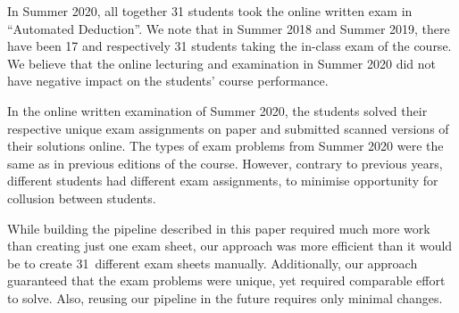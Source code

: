 In Summer 2020, all together 31 students took the online written exam
in ``Automated Deduction''. We note that in Summer 2018 and Summer
2019, there have been 17 and respectively 31 students taking
the in-class exam of the course. We believe that the
online lecturing and examination in Summer 2020 did not have negative
impact on the students' course performance.

In the online written examination of Summer 2020, the  students solved
their respective unique exam assignments on paper and submitted
scanned versions of their
solutions online. 
%
The types of exam problems from Summer 2020  were the same as in
previous editions of the course. 
However, contrary to previous years, different students had different exam
assignments, to minimise opportunity for collusion between students.

While building the pipeline described in this paper required much more work
than creating just one exam sheet, our approach was more efficient than
it would be to create 31~different exam sheets manually. Additionally,
our approach guaranteed that the exam problems were
unique, yet required comparable effort to solve.
Also, reusing our pipeline in the future requires only minimal changes.

